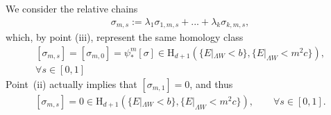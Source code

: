 \documentclass[reqno]{amsart}
\numberwithin{equation}{section}
\theoremstyle{personal}%
\theoremstyle{definition}
\newcommand{\Hom}{\mathrm{H}}
\begin{document}
We consider the relative chains
\begin{align*}
\sigma_{m,s}:=\lambda_1\sigma_{1,m,s} +...+ \lambda_k\sigma_{k,m,s},
\end{align*}
which, by point (iii), represent the same homology class 
\begin{equation*}
\begin{split}
 [\sigma_{m,s}]=[\sigma_{m,0}]=\psi^m_*[\sigma]\in\Hom_{d+1}(\{E|_{\Lambda W}<b\},\{E|_{\Lambda W}<m^2c\}),
\\
\forall s\in[0,1]
\end{split}
\end{equation*}
Point~(ii) actually implies that $[\sigma_{m,1}]=0$, and thus
\begin{align}
\label{e:hom_vanishing}
 [\sigma_{m,s}]=0\in\Hom_{d+1}(\{E|_{\Lambda W}<b\},\{E|_{\Lambda W}<m^2c\}),
 \qquad\forall s\in[0,1].
\end{align}
\end{document}
